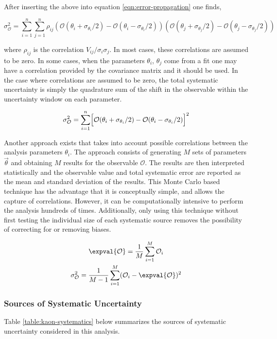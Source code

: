 After inserting the above into equation \ref{eqn:error-propagation} one finds,

\begin{equation}
  \sigma_{\mathcal{O}}^{2} = \sum_{i=1}^{n} \sum_{j=1}^{n} \rho_{ij} (\mathcal{O}(\theta_i + \sigma_{\theta_i}/2) - \mathcal{O}(\theta_i - \sigma_{\theta_i}/2)) (\mathcal{O}(\theta_j + \sigma_{\theta_j}/2) - \mathcal{O}(\theta_j - \sigma_{\theta_j}/2)) 
\end{equation}

where $\rho_{ij}$ is the correlation $V_{ij}/\sigma_i \sigma_j$.  In most cases, these correlations are assumed to be zero.  In some cases, when the parameters $\theta_i$, $\theta_j$ come from a fit one may have a correlation provided by the covariance matrix and it should be used.  In the case where correlations are assumed to be zero, the total systematic uncertainty is simply the quadrature sum of the shift in the observable within the uncertainty window on each parameter.

\begin{equation}
  \sigma_{\mathcal{O}}^{2} = \sum_{i=1}^{n} \Bigl[ \mathcal{O}(\theta_i + \sigma_{\theta_i}/2) - \mathcal{O}(\theta_i - \sigma_{\theta_i}/2) \Bigr]^2
\end{equation}

Another approach exists that takes into account possible correlations between the analysis parameters $\theta_i$.  The approach consists of generating $M$ sets of parameters $\vec{\theta}$ and obtaining $M$ results for the observable $\mathcal{O}$.  The results are then interpreted statistically and the observable value and total systematic error are reported as the mean and standard deviation of the results.  This Monte Carlo based technique has the advantage that it is conceptually simple, and allows the capture of correlations.  However, it can be computationally intensive to perform the analysis hundreds of times.  Additionally, only using this technique without first testing the individual size of each systematic source removes the possibility of correcting for or removing biases.

\begin{gather}
  \expval{\mathcal{O}} = \frac{1}{M} \sum_{i=1}^{M} \mathcal{O}_i \\
  \sigma_{\mathcal{O}}^{2} = \frac{1}{M-1} \sum_{i=1}^{M} (\mathcal{O}_i - \expval{\mathcal{O}})^2
\end{gather}

\subsubsection*{Sources of Systematic Uncertainty}
Table \ref{table:kaon-systematics} below summarizes the sources of systematic uncertainty considered in this analysis.

